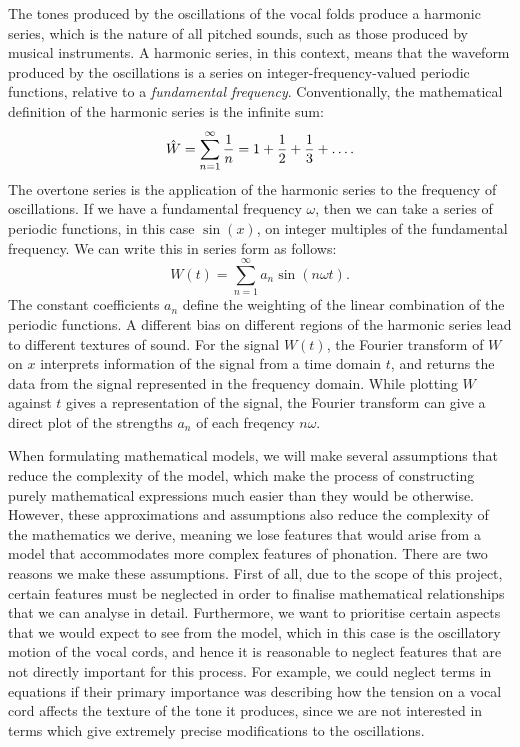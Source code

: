 \documentclass{book}
\begin{document}
The tones produced by the oscillations of the vocal folds produce a harmonic series,
which is the nature of all pitched sounds, such as those produced by musical instruments.
A harmonic series, in this context,
means that the waveform produced by the oscillations is a series on integer-frequency-valued periodic functions,
relative to a \textit{fundamental frequency}.
Conventionally, the mathematical definition of the harmonic series is the infinite sum:
\begin{equation}
    \hat{W} = \sum_{n=1}^{\infty}\frac{1}{n} = 1 + \frac{1}{2} + \frac{1}{3} + \mathellipsis.
\end{equation}
The overtone series is the application of the harmonic series to the frequency of oscillations.
If we have a fundamental frequency $\omega$, then we can take a series of periodic functions, in this case $\sin(x)$,
on integer multiples of the fundamental frequency. We can write this in series form as follows:
\begin{equation}
    W(t) = \sum_{n=1}^{\infty}a_n \sin(n \omega t).
\end{equation}
The constant coefficients $a_n$ define the weighting of the linear combination of the periodic functions.
A different bias on different regions of the harmonic series lead to different textures of sound.
For the signal $W(t)$, the Fourier transform of $W$ on $x$ interprets information of the signal from a time domain $t$,
and returns the data from the signal represented in the frequency domain.
While plotting $W$ against $t$ gives a representation of the signal,
the Fourier transform can give a direct plot of the strengths $a_n$ of each freqency $n\omega$. 

When formulating mathematical models,
we will make several assumptions that reduce the complexity of the model,
which make the process of constructing purely mathematical expressions much easier than they would be otherwise.
However, these approximations and assumptions also reduce the complexity of the mathematics we derive,
meaning we lose features that would arise from a model that accommodates more complex features of phonation.
There are two reasons we make these assumptions.
First of all, due to the scope of this project,
certain features must be neglected in order to finalise mathematical relationships that we can analyse in detail.
Furthermore, we want to prioritise certain aspects that we would expect to see from the model,
which in this case is the oscillatory motion of the vocal cords,
and hence it is reasonable to neglect features that are not directly important for this process.
For example, we could neglect terms in equations if their primary importance was describing how the tension on a vocal cord affects the texture of the tone it produces,
since we are not interested in terms which give extremely precise modifications to the oscillations.
\end{document}
